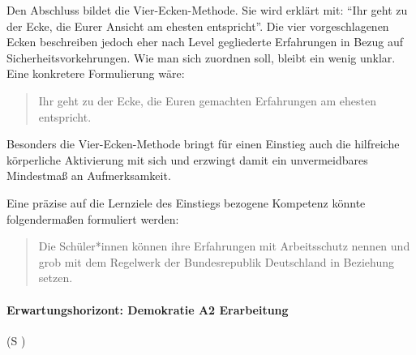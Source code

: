 Den Abschluss bildet die Vier-Ecken-Methode. Sie wird erklärt mit: \enquote{Ihr geht zu der Ecke, die Eurer Ansicht am ehesten entspricht}.
Die vier vorgeschlagenen Ecken beschreiben jedoch eher nach Level gegliederte Erfahrungen in Bezug auf Sicherheitsvorkehrungen. Wie man sich zuordnen soll, bleibt ein wenig unklar. Eine konkretere Formulierung wäre: %
\begin{quote}
    Ihr geht zu der Ecke, die Euren gemachten Erfahrungen am ehesten entspricht. 
\end{quote}

Besonders die Vier-Ecken-Methode bringt für einen Einstieg auch die hilfreiche körperliche Aktivierung mit sich und erzwingt damit ein unvermeidbares Mindestmaß an Aufmerksamkeit.  

Eine präzise auf die Lernziele des Einstiegs bezogene Kompetenz könnte folgendermaßen formuliert werden:
\begin{quote}
    Die Schüler*innen können ihre Erfahrungen mit Arbeitsschutz nennen und grob mit dem Regelwerk der Bundesrepublik Deutschland in Beziehung setzen. 
\end{quote}



\paragraph{Erwartungshorizont: Demokratie A2 Erarbeitung} (\gls{S} \pageref{DEMOKRATIE-A2})

